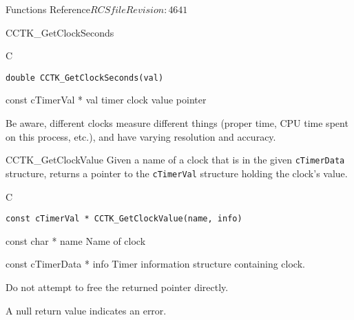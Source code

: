 \begin{cactuspart}{ Functions Reference}{$RCSfile$}{$Revision: 4641 $}
\begin{FunctionDescription}{CCTK\_GetClockSeconds}
\begin{SynopsisSection}
\begin{Synopsis}{C}
\begin{verbatim}
double CCTK_GetClockSeconds(val)
\end{verbatim}
\end{Synopsis}
\end{SynopsisSection}

\begin{ParameterSection}
\begin{Parameter}{const cTimerVal * val}
timer clock value pointer
\end{Parameter}
\end{ParameterSection}

\begin{Discussion}
Be aware, different clocks measure different things (proper time,
CPU time spent on this process, etc.), and have varying resolution
and accuracy.
\end{Discussion}
\end{FunctionDescription}


\begin{FunctionDescription}{CCTK\_GetClockValue}
\label{CCTK-GetClockValue}
Given a name of a clock that is
in the given {\tt cTimerData} structure,
returns a pointer to the {\tt cTimerVal} structure holding the clock's value.
\begin{SynopsisSection}
\begin{Synopsis}{C}
\begin{verbatim}
const cTimerVal * CCTK_GetClockValue(name, info)
\end{verbatim}
\end{Synopsis}
\end{SynopsisSection}

\begin{ParameterSection}
\begin{Parameter} {const char * name}
Name of clock
\end{Parameter}

\begin{Parameter} {const cTimerData * info}
Timer information structure containing clock.
\end{Parameter}
\end{ParameterSection}

\begin{Discussion}
Do not attempt to free the returned pointer directly.
\end{Discussion}
\begin{ErrorSection}
\begin{Error}
A null return value indicates an error.
\end{Error}
\end{ErrorSection}
\end{FunctionDescription}




\end{cactuspart}

